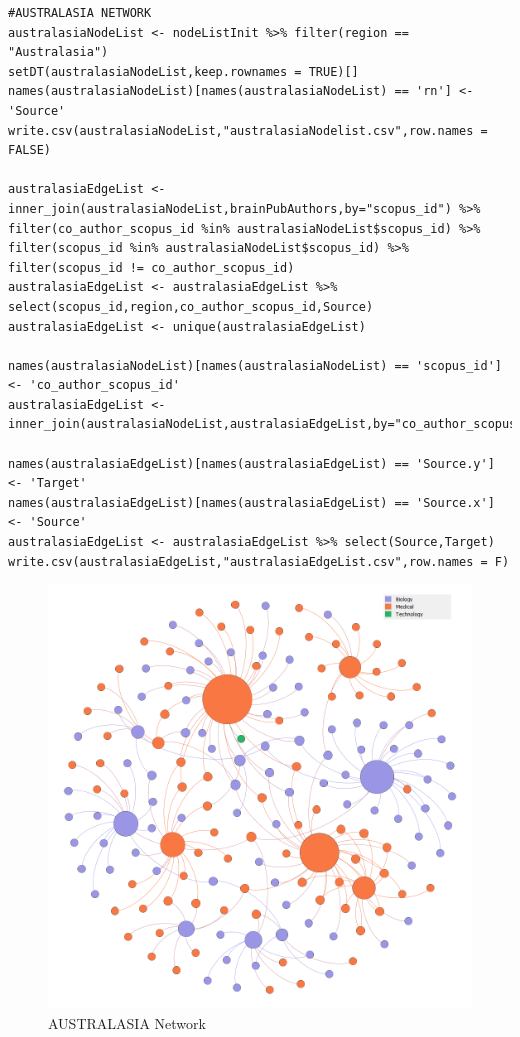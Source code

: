 \documentclass[a4paper,11pt]{article}
\theoremstyle{mytheor}
\begin{document}
\begin{lstlisting}
#AUSTRALASIA NETWORK
australasiaNodeList <- nodeListInit %>% filter(region == "Australasia")
setDT(australasiaNodeList,keep.rownames = TRUE)[]
names(australasiaNodeList)[names(australasiaNodeList) == 'rn'] <- 'Source'
write.csv(australasiaNodeList,"australasiaNodelist.csv",row.names = FALSE)

australasiaEdgeList <- inner_join(australasiaNodeList,brainPubAuthors,by="scopus_id") %>% filter(co_author_scopus_id %in% australasiaNodeList$scopus_id) %>% filter(scopus_id %in% australasiaNodeList$scopus_id) %>% filter(scopus_id != co_author_scopus_id)
australasiaEdgeList <- australasiaEdgeList %>% select(scopus_id,region,co_author_scopus_id,Source)
australasiaEdgeList <- unique(australasiaEdgeList)

names(australasiaNodeList)[names(australasiaNodeList) == 'scopus_id'] <- 'co_author_scopus_id'
australasiaEdgeList <- inner_join(australasiaNodeList,australasiaEdgeList,by="co_author_scopus_id")

names(australasiaEdgeList)[names(australasiaEdgeList) == 'Source.y'] <- 'Target'
names(australasiaEdgeList)[names(australasiaEdgeList) == 'Source.x'] <- 'Source'
australasiaEdgeList <- australasiaEdgeList %>% select(Source,Target)
write.csv(australasiaEdgeList,"australasiaEdgeList.csv",row.names = F)
\end{lstlisting} \newpage

\begin{figure}[ht]
    \centering
    \includegraphics[width=15cm]{australianet_legend2.png}
    \caption{AUSTRALASIA Network}
    \label{fig:AUSTRALASIA Network}
\end{figure}
\end{document}
